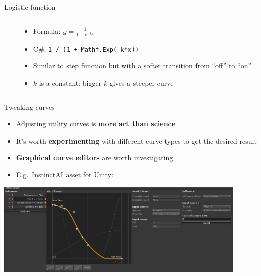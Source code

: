 \begin{frame}[fragile]{Logistic function}
    \begin{columns}
        \begin{column}{0.5\textwidth}
            \begin{center}
            \end{center}
        \end{column}
        \begin{column}{0.47\textwidth}
            \begin{itemize}
                \pause\item Formula: $y = \frac{1}{1+e^{-kx}}$
                \pause\item C\#: \lstinline{1 / (1 + Mathf.Exp(-k*x))}
                \pause\item Similar to step function but with a softer transition from ``off'' to ``on''
                \pause\item $k$ is a constant: bigger $k$ gives a steeper curve
            \end{itemize}
        \end{column}
    \end{columns}
\end{frame}

\begin{frame}{Tweaking curves}
    \begin{itemize}
        \pause\item Adjusting utility curves is \textbf{more art than science}
        \pause\item It's worth \textbf{experimenting} with different curve types to get the desired result
        \pause\item \textbf{Graphical curve editors} are worth investigating
        \pause\item E.g.\ InstinctAI asset for Unity:
    \end{itemize}
    \begin{center}
        \includegraphics[width=0.9\textwidth]{instinctai}
    \end{center}
\end{frame}

